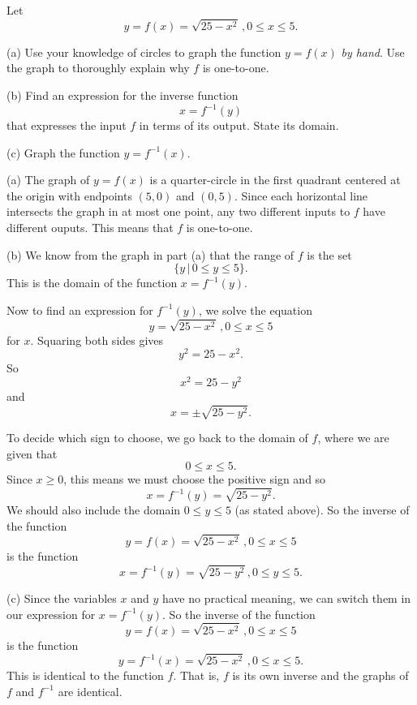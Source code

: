 \documentclass{ximera}
\begin{document}
\begin{example} \label{Ex98:Quadratics}
Let 
\[
    y=   f(x) = \sqrt{25-x^2} \, , 0\leq x \leq 5 .
\]

(a) Use your knowledge of circles to graph the function $y=f(x)$ \emph{by hand}. Use the graph to thoroughly explain why $f$ is one-to-one.

(b) Find an expression for the inverse function
\[
    x = f^{-1}(y)
\]
that expresses the input $f$ in terms of its output. State its domain.

(c) Graph the function $y=f^{-1}(x)$.


\begin{explanation}
(a) The graph of $y=f(x)$ is a quarter-circle in the first quadrant centered at the origin with endpoints $(5,0)$ and $(0,5)$. Since each horizontal line intersects the graph in at most one point, any two different inputs to $f$ have different ouputs. This means that $f$ is one-to-one.

(b) We know from the graph in part (a) that the range of $f$ is the set
\[
   \{ y \, | \,  0\leq y \leq 5 \} .
\]
This is the domain of the function $x=f^{-1}(y)$.

Now to find an expression for $f^{-1}(y)$, we solve the equation
\[
   y=   \sqrt{25-x^2} \, , 0\leq x \leq 5 
\]
for $x$. Squaring both sides gives
\[
   y^2 = 25 - x^2 .
\]
So 
\[
     x^2 = 25-y^2
\]
and 
\[
   x  = \pm \sqrt{25-y^2} .
\]

To decide which sign to choose, we go back to the domain of $f$, where we are given that 
\[
     0 \leq x \leq 5 .
\]
Since $x\geq 0$, this means we must choose the positive sign and so
\[
    x = f^{-1}(y) = \sqrt{25-y^2}.
\]
We should also include the domain $0\leq y \leq 5$ (as stated above). So the inverse of the function
\[
    y=   f(x) = \sqrt{25-x^2} \, , 0\leq x \leq 5 
\]
is the function
\[
    x = f^{-1}(y) = \sqrt{25-y^2} \, , 0\leq y \leq 5 .
\]

(c) Since the variables $x$ and $y$ have no practical meaning, we can switch them in our expression for $x = f^{-1}(y)$. So the inverse of the function
\[
    y=   f(x) = \sqrt{25-x^2} \, , 0\leq x \leq 5 
\]
is the function
\[
    y = f^{-1}(x) = \sqrt{25-x^2} \, , 0\leq x \leq 5 .
\]
This is identical to the function $f$. That is, $f$ is its own inverse and the graphs of $f$ and $f^{-1}$ are identical.

\end{explanation}

\end{example}
\end{document}
